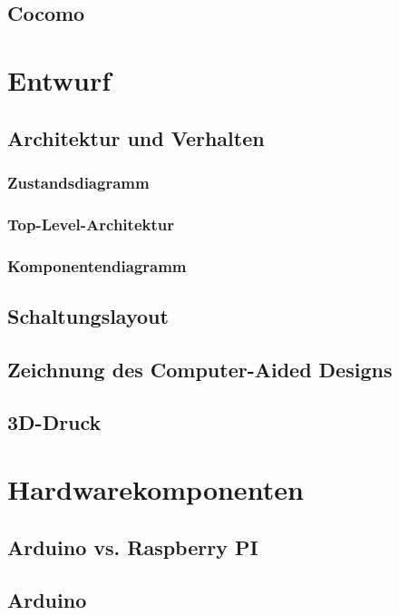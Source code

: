 \documentclass[12pt,			%
a4paper,						%
twoside, 						%
listof=totoc, 					%
bibliography=totoc,				%
titlepage, 						%
headsepline, 					%
DIV18,							%
BCOR6mm,						%
cleardoublepage=empty,			%
parskip,						%
ngerman							%
]{scrbook}
\begin{document}
\section{Cocomo}


\chapter{Entwurf}

\section{Architektur und Verhalten}

\subsection{Zustandsdiagramm}

\subsection{Top-Level-Architektur}

\subsection{Komponentendiagramm}

\section{Schaltungslayout}

\section{Zeichnung des Computer-Aided Designs}

\section{3D-Druck}


\chapter{Hardwarekomponenten}

\section{Arduino vs. Raspberry PI}

\section{Arduino}

\end{document}

